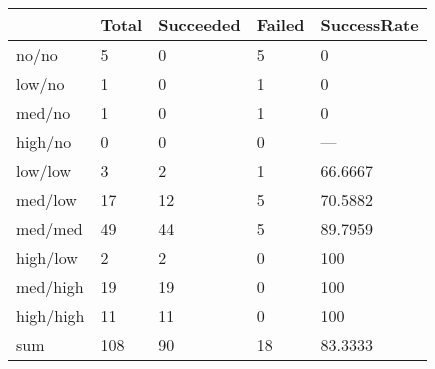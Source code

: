 \begin{tabular}{lllll}
& Total & Succeeded & Failed & SuccessRate \\ 
\hline 
no/no & 5 & 0 & 5 & 0 \\ 
low/no & 1 & 0 & 1 & 0 \\ 
med/no & 1 & 0 & 1 & 0 \\ 
high/no & 0 & 0 & 0 & --- \\ 
low/low & 3 & 2 & 1 & 66.6667 \\ 
med/low & 17 & 12 & 5 & 70.5882 \\ 
med/med & 49 & 44 & 5 & 89.7959 \\ 
high/low & 2 & 2 & 0 & 100 \\ 
med/high & 19 & 19 & 0 & 100 \\ 
high/high & 11 & 11 & 0 & 100 \\ 
sum & 108 & 90 & 18 & 83.3333 \\ 
\hline 
\end{tabular}